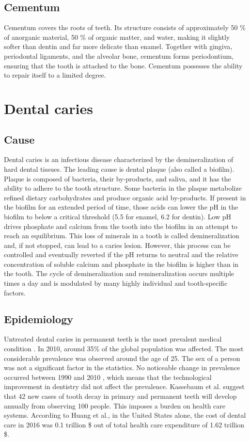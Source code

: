 \subsection*{Cementum}
Cementum covers the roots of teeth. Its structure consists of approximately 50 \% of anorganic material, 50 \% of organic matter, and water, making it slightly softer than dentin and far more delicate than enamel. Together with gingiva, periodontal ligaments, and the alveolar bone, cementum forms periodontium, ensuring that the tooth is attached to the bone. Cementum possesses the ability to repair itself to a limited degree.

\section{Dental caries}

\subsection{Cause}
Dental caries is an infectious disease characterized by the demineralization of hard dental tissues. The leading cause is dental plaque (also called a biofilm). Plaque is composed of bacteria, their by-products, and saliva, and it has the ability to adhere to the tooth structure. Some bacteria in the plaque metabolize refined dietary carbohydrates and produce organic acid by-products. If present in the biofilm for an extended period of time, those acids can lower the pH in the biofilm to below a critical threshold (5.5 for enamel, 6.2 for dentin)\cite{2019a}. Low pH drives phosphate and calcium from the tooth into the biofilm in an attempt to reach an equilibrium. This loss of minerals in a tooth is called demineralization and, if not stopped, can lead to a caries lesion. However, this process can be controlled and eventually reverted if the pH returns to neutral and the relative concentration of soluble calcium and phosphate in the biofilm is higher than in the tooth. The cycle of demineralization and remineralization occurs multiple times a day and is modulated by many highly individual and tooth-specific factors.

\subsection{Epidemiology}
Untreated dental caries in permanent teeth is the most prevalent medical condition \cite{Kassebaum2015}. In 2010, around 35\% of the global population was affected. The most considerable prevalence was observed around the age of 25. The sex of a person was not a significant factor in the statistics. No noticeable change in prevalence occurred between 1990 and 2010 \cite{Kassebaum2015} \cite{Frencken2017}, which means that the technological improvement in dentistry did not affect the prevalence.
Kassebaum et al. suggest that 42 new cases of tooth decay in primary and permanent teeth will develop annually from observing 100 people. This imposes a burden on health care systems. According to Huang et al., \cite{Hung2020} in the United States alone, the cost of dental care in 2016 was 0.1 trillion \$ out of total health care expenditure of 1.62 trillion \$.

